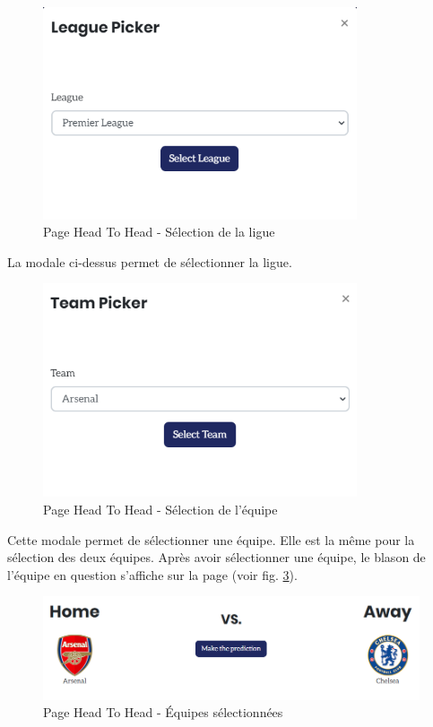 \documentclass[a4paper,14pt]{extarticle}
\begin{document}
{\begin{figure}[H]
    \centering
    \includegraphics[width=25em]{./img/leagueSelection.png}
    \caption{Page Head To Head - Sélection de la ligue}
    \label{fig:leagueSelection}
\end{figure}

La modale ci-dessus permet de sélectionner la ligue.

\begin{figure}[H]
    \centering
    \includegraphics[width=25em]{./img/teamSelection.png}
    \caption{Page Head To Head - Sélection de l'équipe}
    \label{fig:teamSelection}
\end{figure}

Cette modale permet de sélectionner une équipe. Elle est la même pour la sélection des deux équipes.
Après avoir sélectionner une équipe, le blason de l'équipe en question s'affiche sur la page (voir fig. \ref{fig:teamsSelected}). 

\begin{figure}[H]
    \centering
    \includegraphics[width=30em]{./img/teamsSelected.png}
    \caption{Page Head To Head - Équipes sélectionnées}
    \label{fig:teamsSelected}
\end{figure}

}
\end{document}
